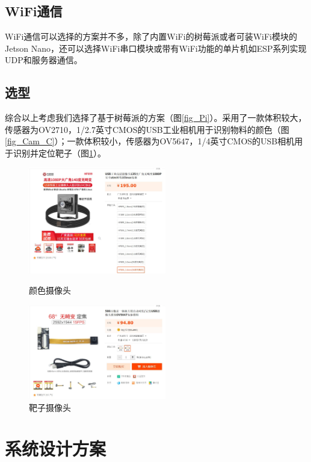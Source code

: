 \documentclass[a4paper,11pt,UTF8]{ctexart}
\begin{document}
\subsection{WiFi通信}
WiFi通信可以选择的方案并不多，除了内置WiFi的树莓派或者可装WiFi模块的Jetson Nano，还可以选择WiFi串口模块或带有WiFi功能的单片机如ESP系列实现UDP和服务器通信。

\subsection{选型}
综合以上考虑我们选择了基于树莓派的方案（图\ref{fig_Pi}）。采用了一款体积较大，传感器为OV2710，1/2.7英寸CMOS的USB工业相机用于识别物料的颜色（图\ref{fig_Cam_C}）；一款体积较小，传感器为OV5647，1/4英寸CMOS的USB相机用于识别并定位靶子（图\ref{fig_Cam_T}）。


\begin{figure}[htbp]
  \begin{center}
    \begin{minipage}[t]{0.45\linewidth}
      \centering
      \includegraphics[width=6cm]{颜色摄像头.jpg}
      \caption{颜色摄像头}\label{fig_Cam_C}
    \end{minipage}%
    \begin{minipage}[t]{0.45\linewidth}
      \centering
      \includegraphics[width=6cm]{靶子摄像头.jpg}
      \caption{靶子摄像头}\label{fig_Cam_T}
    \end{minipage}
  \end{center}
\end{figure}

\section{系统设计方案}
\end{document}
